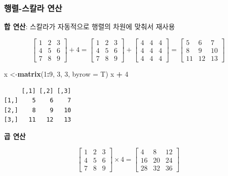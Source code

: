 \documentclass[
  11pt,
]{krantz}
\newenvironment{Shaded}{\begin{snugshade}}{\end{snugshade}}
\newcommand{\DataTypeTok}[1]{\textcolor[rgb]{0.27,0.27,0.27}{#1}}
\newcommand{\DecValTok}[1]{\textcolor[rgb]{0.06,0.06,0.06}{#1}}
\newcommand{\KeywordTok}[1]{\textcolor[rgb]{0.27,0.27,0.27}{\textbf{#1}}}
\newcommand{\NormalTok}[1]{#1}
\newcommand{\OperatorTok}[1]{\textcolor[rgb]{0.43,0.43,0.43}{\textbf{#1}}}
\newcommand{\StringTok}[1]{\textcolor[rgb]{0.5,0.5,0.5}{#1}}
\begin{document}
\hypertarget{mat-op-s}{%
\subsubsection*{\texorpdfstring{\textbf{행렬-스칼라 연산}}{행렬-스칼라 연산}}\label{mat-op-s}}


\textbf{합 연산}: 스칼라가 자동적으로 행렬의 차원에 맞춰서 재사용

\[\begin{bmatrix}
1 & 2 & 3 \\
4 & 5 & 6 \\ 
7 & 8 & 9
\end{bmatrix} + 4 = 
\begin{bmatrix}
1 & 2 & 3 \\
4 & 5 & 6 \\ 
7 & 8 & 9
\end{bmatrix} + 
\begin{bmatrix}
4 & 4 & 4 \\
4 & 4 & 4 \\ 
4 & 4 & 4
\end{bmatrix} = 
\begin{bmatrix}
5 &  6  & 7 \\
8 &  9  & 10 \\ 
11 & 12 & 13
\end{bmatrix}
\]

\footnotesize

\begin{Shaded}
\begin{Highlighting}[]
\NormalTok{x <-}\KeywordTok{matrix}\NormalTok{(}\DecValTok{1}\OperatorTok{:}\DecValTok{9}\NormalTok{, }\DecValTok{3}\NormalTok{, }\DecValTok{3}\NormalTok{, }\DataTypeTok{byrow =}\NormalTok{ T)}
\NormalTok{x }\OperatorTok{+}\StringTok{ }\DecValTok{4}
\end{Highlighting}
\end{Shaded}

\begin{verbatim}
     [,1] [,2] [,3]
[1,]    5    6    7
[2,]    8    9   10
[3,]   11   12   13
\end{verbatim}

\normalsize

\textbf{곱 연산}

\[\begin{bmatrix}
1 & 2 & 3 \\
4 & 5 & 6 \\ 
7 & 8 & 9
\end{bmatrix} \times 4 = 
\begin{bmatrix}
4  &  8 & 12 \\
16 & 20 & 24 \\ 
28 & 32 & 36
\end{bmatrix} 
\]
\end{document}
